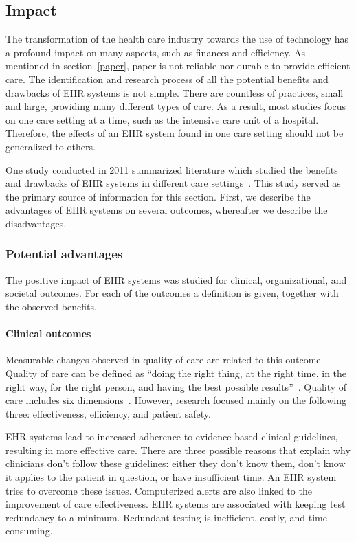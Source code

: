     \subsection{Impact}\label{impact_ehrs}

    The transformation of the health care industry towards the use of technology has a profound impact on many aspects, such as finances and efficiency. As mentioned in section~\ref{paper}, paper is not reliable nor durable to provide efficient care. The identification and research process of all the potential benefits and drawbacks of EHR systems is not simple. There are countless of practices, small and large, providing many different types of care. As a result, most studies focus on one care setting at a time, such as the intensive care unit of a hospital. Therefore, the effects of an EHR system found in one care setting should not be generalized to others.

    One study conducted in 2011 summarized literature which studied the benefits and drawbacks of EHR systems in different care settings~\cite{Menachemi2011}. This study served as the primary source of information for this section. First, we describe the advantages of EHR systems on several outcomes, whereafter we describe the disadvantages.

        \subsubsection{Potential advantages}\label{ehrs_advantages}

        The positive impact of EHR systems was studied for clinical, organizational, and societal outcomes. For each of the outcomes a definition is given, together with the observed benefits.

        \paragraph{Clinical outcomes} Measurable changes observed in quality of care are related to this outcome. Quality of care can be defined as ``doing the right thing, at the right time, in the right way, for the right person, and having the best possible results''~\cite{AHRQ2001}. Quality of care includes six dimensions~\cite{CTQC2001}. However, research focused mainly on the following three: effectiveness, efficiency, and patient safety.

        EHR systems lead to increased adherence to evidence-based clinical guidelines, resulting in more effective care. There are three possible reasons that explain why clinicians don't follow these guidelines: either they don't know them, don't know it applies to the patient in question, or have insufficient time. An EHR system tries to overcome these issues. Computerized alerts are also linked to the improvement of care effectiveness. EHR systems are associated with keeping test redundancy to a minimum. Redundant testing is inefficient, costly, and time-consuming. 

